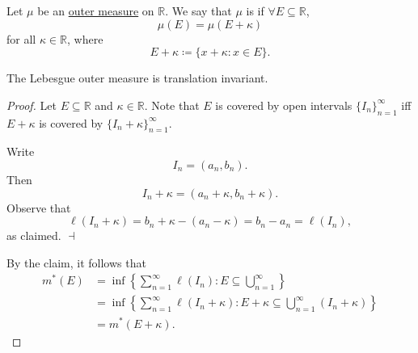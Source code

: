\documentclass[notoc,notitlepage]{tufte-book}
\begin{document}
\begin{defn}\label{defn:translation_invariant}
  Let $\mu$ be an \hyperref[defn:outer_measure]{outer measure} on $\mathbb{R}$.
  We say that $\mu$ is  if $\forall E \subseteq
  \mathbb{R}$,
  \begin{equation*}
    \mu(E) = \mu(E + \kappa)
  \end{equation*}
  for all $\kappa \in \mathbb{R}$, where
  \begin{equation*}
    E + \kappa \coloneqq \{ x + \kappa : x \in E \}.
  \end{equation*}
\end{defn}

\begin{propo}\label{propo:translation_invariance_of_the_lom}
  The Lebesgue outer measure is translation invariant.
\end{propo}

\begin{proof}
  Let $E \subseteq \mathbb{R}$ and $\kappa \in \mathbb{R}$. Note that $E$ is
  covered by open intervals $\{ I_n \}_{n=1}^{\infty}$ iff $E + \kappa$ is
  covered by $\{ I_n + \kappa \}_{n=1}^{\infty}$.

  \noindent
   Write
  \begin{equation*}
    I_n = (a_n, b_n).
  \end{equation*}
  Then
  \begin{equation*}
    I_n + \kappa = (a_n + \kappa, b_n + \kappa).
  \end{equation*}
  Observe that
  \begin{equation*}
    \ell(I_n + \kappa) = b_n + \kappa - (a_n - \kappa) = b_n - a_n = \ell(I_n),
  \end{equation*}
  as claimed. $\dashv$

  By the claim, it follows that
  \begin{align*}
    m^*(E) &= \inf \left\{ \sum_{n=1}^{\infty} \ell(I_n) : E \subseteq
            \bigcup_{n=1}^{\infty} \right\} \\
           &= \inf \left\{ \sum_{n=1}^{\infty} \ell(I_n + \kappa) : E + \kappa \subseteq
           \bigcup_{n=1}^{\infty} (I_n + \kappa)  \right\} \\
           &= m^*(E + \kappa).
  \end{align*}
\end{proof}
\end{document}
